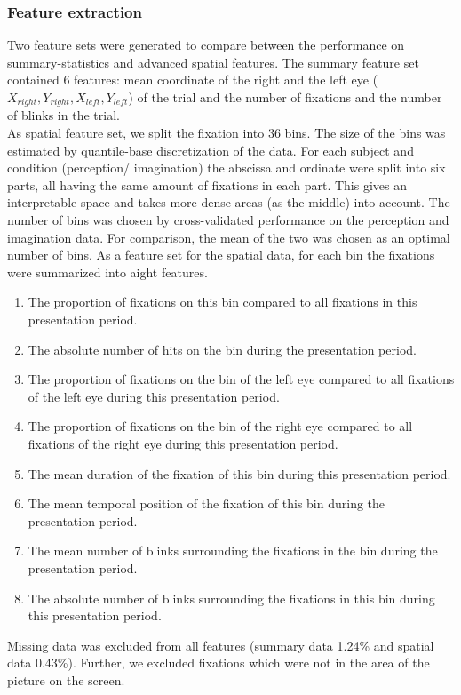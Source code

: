 \documentclass[a4paper,man,natbib,floatsintext]{apa6}
\begin{document}
\subsubsection{Feature extraction}
Two feature sets were generated to compare between the performance on summary-statistics and advanced spatial features. 
The summary feature set contained 6 features: mean coordinate of the right and the left eye ($X_{right}, Y_{right}, X_{left}, Y_{left}$) of the trial and the number of fixations and the number of blinks in the trial. \\
As spatial feature set, we split the fixation into 36 bins. The size of the bins was estimated by quantile-base discretization of the data. For each subject and condition (perception/ imagination) the abscissa and ordinate were split into six parts, all having the same amount of fixations in each part. This gives an interpretable space and takes more dense areas (as the middle) into account. The number of bins was chosen by cross-validated performance on the perception and imagination data. For comparison, the mean of the two was chosen as an optimal number of bins. %
As a feature set for the spatial data, for each bin the fixations were summarized into aight features. 
 \begin{enumerate}
\item The proportion of fixations on this bin compared to all fixations in this presentation period. 
\item The absolute number of hits on the bin during the presentation period.
\item The proportion of fixations on the bin of the left eye compared to all fixations of the left eye during this presentation period.
\item The proportion of fixations on the bin of the right eye compared to all fixations of the right eye during this presentation period. 
\item The mean duration of the fixation of this bin during this presentation period.
\item The mean temporal position of the fixation of this bin during the presentation period.
\item The mean number of blinks surrounding the fixations in the bin during the presentation period.
\item The absolute number of blinks surrounding the fixations in this bin during this presentation period.
\end{enumerate}
Missing data was excluded from all features (summary data 1.24\% and spatial data 0.43\%). Further, we excluded fixations which were not in the area of the picture on the screen. \\
\end{document}
